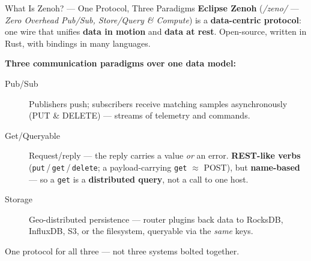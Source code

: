 \documentclass[9pt]{beamer}
\begin{document}
\begin{frame}{What Is Zenoh? --- One Protocol, Three Paradigms}
  \textbf{Eclipse Zenoh} (\textit{/zeno/} --- \emph{Zero Overhead Pub/Sub, Store/Query \& Compute}) is a \textbf{data-centric protocol}: one wire that unifies \textbf{data in motion} and \textbf{data at rest}. Open-source, written in Rust, with bindings in many languages.

  \vspace{0.5em}
  \textbf{Three communication paradigms over one data model:}
  \begin{description}
    \item[Pub/Sub] Publishers push; subscribers receive matching samples asynchronously (PUT \& DELETE) --- streams of telemetry and commands.
    \item[Get/Queryable] Request/reply --- the reply carries a value \emph{or} an error. \textbf{REST-like verbs} (\texttt{put}\,/\,\texttt{get}\,/\,\texttt{delete}; a payload-carrying \texttt{get} $\approx$ POST), but \textbf{name-based} --- so a \texttt{get} is a \textbf{distributed query}, not a call to one host.
    \item[Storage] Geo-distributed persistence --- router plugins back data to RocksDB, InfluxDB, S3, or the filesystem, queryable via the \emph{same} keys.
  \end{description}

  \vspace{0.3em}
  \begin{center}{\small One protocol for all three --- not three systems bolted together.}\end{center}
\end{frame}
\end{document}
